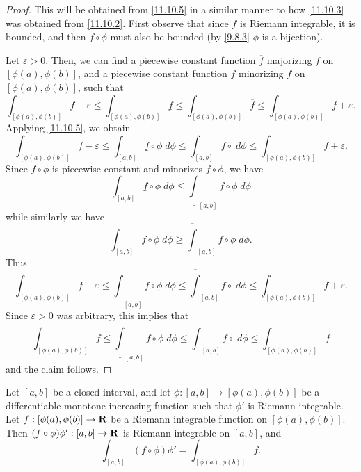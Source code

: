\begin{proof}
  This will be obtained from \cref{11.10.5} in a similar manner to how \cref{11.10.3} was obtained from \cref{11.10.2}.
  First observe that since \(f\) is Riemann integrable, it is bounded, and then \(f \circ \phi\) must also be bounded (by \cref{9.8.3} \(\phi\) is a bijection).

  Let \(\varepsilon > 0\).
  Then, we can find a piecewise constant function \(\overline{f}\) majorizing \(f\) on \([\phi(a), \phi(b)]\), and a piecewise constant function \(\underline{f}\) minorizing \(f\) on \([\phi(a), \phi(b)]\), such that
  \[
    \int_{[\phi(a), \phi(b)]} f - \varepsilon \leq \int_{[\phi(a), \phi(b)]} \underline{f} \leq \int_{[\phi(a), \phi(b)]} \overline{f} \leq \int_{[\phi(a), \phi(b)]} f + \varepsilon.
  \]
  Applying \cref{11.10.5}, we obtain
  \[
    \int_{[\phi(a), \phi(b)]} f - \varepsilon \leq \int_{[a, b]} \underline{f} \circ \phi \; d \phi \leq \int_{[a, b]} \overline{f} \circ \; d \phi \leq \int_{[\phi(a), \phi(b)]} f + \varepsilon.
  \]
  Since \(\underline{f} \circ \phi\) is piecewise constant and minorizes \(f \circ \phi\), we have
  \[
    \int_{[a, b]} \underline{f} \circ \phi \; d \phi \leq \underline{\int}_{[a, b]} f \circ \phi \; d \phi
  \]
  while similarly we have
  \[
    \int_{[a, b]} \overline{f} \circ \phi \; d \phi \geq \overline{\int}_{[a, b]} f \circ \phi \; d \phi.
  \]
  Thus
  \[
    \int_{[\phi(a), \phi(b)]} f - \varepsilon \leq \underline{\int}_{[a, b]} f \circ \phi \; d \phi \leq \overline{\int}_{[a, b]} f \circ \; d \phi \leq \int_{[\phi(a), \phi(b)]} f + \varepsilon.
  \]
  Since \(\varepsilon > 0\) was arbitrary, this implies that
  \[
    \int_{[\phi(a), \phi(b)]} f \leq \underline{\int}_{[a, b]} f \circ \phi \; d \phi \leq \overline{\int}_{[a, b]} f \circ \; d \phi \leq \int_{[\phi(a), \phi(b)]} f
  \]
  and the claim follows.
\end{proof}

\begin{proposition}\label{11.10.7}
  Let \([a, b]\) be a closed interval, and let \(\phi : [a, b] \to [\phi(a), \phi(b)]\) be a differentiable monotone increasing function such that \(\phi'\) is Riemann integrable.
  Let \(f : [\phi(a), \phi(b)] \to \mathbf{R}\) be a Riemann integrable function on \([\phi(a), \phi(b)]\).
  Then \((f \circ \phi) \phi' : [a, b] \to \mathbf{R}\) is Riemann integrable on \([a, b]\), and
  \[
    \int_{[a, b]} (f \circ \phi) \phi' = \int_{[\phi(a), \phi(b)]} f.
  \]
\end{proposition}

